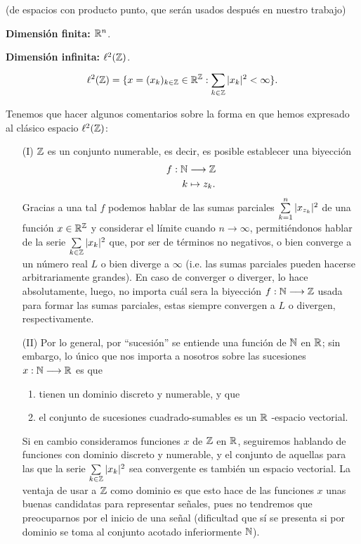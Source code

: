 \begin{ejemplo}
(de espacios con producto punto, que serán usados después en nuestro trabajo)

\textbf{Dimensión finita: $\mathbb{R}^{n}$}. 

\textbf{Dimensión infinita: $\ell^{2}(\mathbb{Z})$}. 
\[
\ell^{2}(\mathbb{Z}) = \{ x=(x_{k})_{k \in \mathbb{Z}} \in \mathbb{R}^{\mathbb{Z}} :
\sum\limits_{k \in \mathbb{Z}}^{}|x_{k}|^{2} < \infty\}.
 \]
 
Tenemos que hacer algunos comentarios sobre la forma
en que hemos expresado al clásico espacio $\ell^{2}(\mathbb{Z})$:

\begin{itemize}
	\item[(I)] $\mathbb{Z}$ es un conjunto numerable,
	es decir, es posible establecer una biyección
	\[
	\begin{split}
	f: \mathbb{N} & \longrightarrow \mathbb{Z} \\
	k & \mapsto z_{k}.
	\end{split}
	\]
	Gracias a una tal $f$ podemos hablar de las sumas
	parciales $\sum\limits_{k=1}^{n}|x_{z_{k}}|^{2}$ de una
	función $x \in \mathbb{R}^{\mathbb{Z}}$ y considerar el límite cuando 
	$n \rightarrow \infty $, permitiéndonos hablar de
	la serie $\sum\limits_{k \in \mathbb{Z}}^{}|x_{k}|^{2}$ que,
	por ser de términos no negativos, o bien converge a un 
	número real $L$ o bien diverge a $\infty$ (i.e. las sumas
	parciales pueden hacerse arbitrariamente grandes).
	En caso de converger o diverger, lo hace absolutamente, 
	luego, no importa cuál sera la biyección 
	$f: \mathbb{N} \longrightarrow \mathbb{Z}$ usada para formar
	las sumas parciales, estas siempre convergen a $L$
	o divergen, respectivamente. 
	
	\item[(II)] Por lo general, por ``sucesión'' se 
	entiende una función de $\mathbb{N}$ en $\mathbb{R}$; sin embargo, lo único 
	que nos importa a nosotros sobre las sucesiones 
	$x: \mathbb{N} \longrightarrow \mathbb{R}$ es que
	\begin{enumerate}
		\item tienen un dominio discreto y numerable, y que
		\item el conjunto de sucesiones cuadrado-sumables
		es un $\mathbb{R}$ -espacio vectorial. 
	\end{enumerate}
	Si en cambio consideramos funciones $x$ de
	$\mathbb{Z}$ en $\mathbb{R}$, seguiremos hablando de funciones
	con dominio discreto y numerable, y el conjunto
	de aquellas para las que la serie 
	$\sum\limits_{k \in \mathbb{Z}}^{}|x_{k}|^{2} $ sea convergente
	es también un espacio vectorial. La ventaja de usar
	a $\mathbb{Z}$ como dominio es que esto hace de las funciones
	$x$ unas buenas candidatas para representar señales,
	pues no tendremos que preocuparnos por el inicio de
	una señal (dificultad que sí se presenta si por dominio
	se toma al conjunto acotado inferiormente $\mathbb{N}$).
\end{itemize}




\end{ejemplo}
